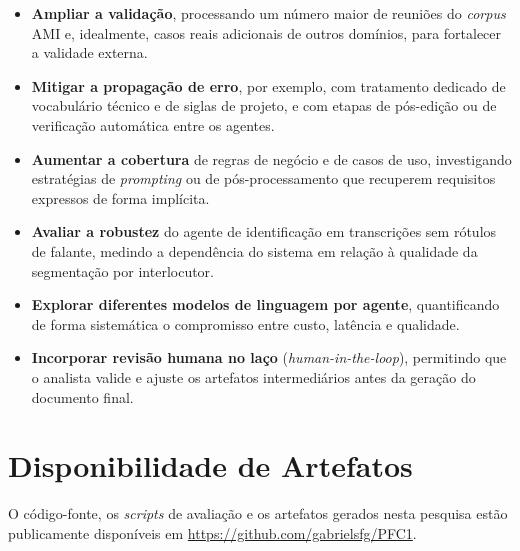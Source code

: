 \begin{itemize}
    \item \textbf{Ampliar a validação}, processando um número maior de reuniões do \textit{corpus} AMI e, idealmente, casos reais adicionais de outros domínios, para fortalecer a validade externa.
    \item \textbf{Mitigar a propagação de erro}, por exemplo, com tratamento dedicado de vocabulário técnico e de siglas de projeto, e com etapas de pós-edição ou de verificação automática entre os agentes.
    \item \textbf{Aumentar a cobertura} de regras de negócio e de casos de uso, investigando estratégias de \textit{prompting} ou de pós-processamento que recuperem requisitos expressos de forma implícita.
    \item \textbf{Avaliar a robustez} do agente de identificação em transcrições sem rótulos de falante, medindo a dependência do sistema em relação à qualidade da segmentação por interlocutor.
    \item \textbf{Explorar diferentes modelos de linguagem por agente}, quantificando de forma sistemática o compromisso entre custo, latência e qualidade.
    \item \textbf{Incorporar revisão humana no laço} (\textit{human-in-the-loop}), permitindo que o analista valide e ajuste os artefatos intermediários antes da geração do documento final.
\end{itemize}

\section{Disponibilidade de Artefatos}
O código-fonte, os \textit{scripts} de avaliação e os artefatos gerados nesta pesquisa estão publicamente disponíveis em \url{https://github.com/gabrielsfg/PFC1}. %
